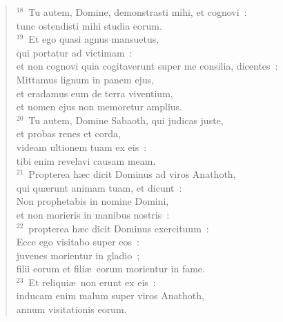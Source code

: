 \begin{flushleft}\begin{verse}${}^{18}$~Tu autem, Domine, demonstrasti mihi, et cognovi~:\\ tunc ostendisti mihi studia eorum.\\
${}^{19}$~Et ego quasi agnus mansuetus,\\ qui portatur ad victimam~:\\ et non cognovi quia cogitaverunt super me consilia, dicentes~:\\ Mittamus lignum in panem ejus,\\ et eradamus eum de terra viventium,\\ et nomen ejus non memoretur amplius.\\
${}^{20}$~Tu autem, Domine Sabaoth, qui judicas juste,\\ et probas renes et corda,\\ videam ultionem tuam ex eis~:\\ tibi enim revelavi causam meam.\\
${}^{21}$~Propterea h\ae c dicit Dominus ad viros Anathoth,\\ qui qu\ae runt animam tuam, et dicunt~:\\ Non prophetabis in nomine Domini,\\ et non morieris in manibus nostris~:\\
${}^{22}$~propterea h\ae c dicit Dominus exercituum~:\\ Ecce ego visitabo super eos~:\\ juvenes morientur in gladio~;\\ filii eorum et fili\ae\ eorum morientur in fame.\\
${}^{23}$~Et reliqui\ae\ non erunt ex eis~:\\ inducam enim malum super viros Anathoth,\\ annum visitationis eorum.\end{verse}\end{flushleft}


